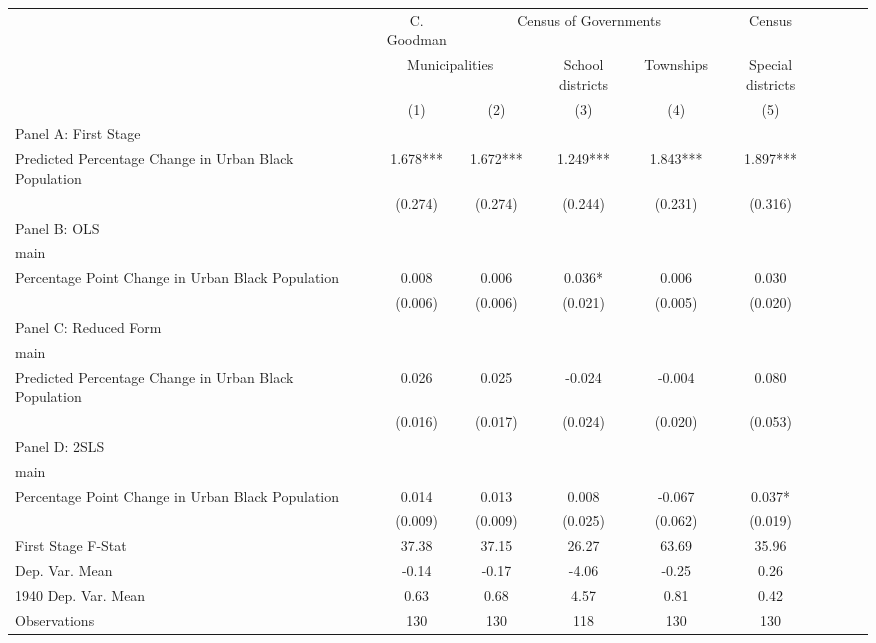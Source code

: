  \begin{tabular}{l*{8}{c}} \toprule
&\multicolumn{1}{c}{C. Goodman}&\multicolumn{3}{c}{Census of Governments}&\multicolumn{1}{c}{Census}\\\cmidrule(lr){2-2}\cmidrule(lr){3-5}\cmidrule(lr){6-6}
&\multicolumn{2}{c}{Municipalities}&\multicolumn{1}{c}{School districts}&\multicolumn{1}{c}{Townships}&\multicolumn{1}{c}{Special districts}&\\\cmidrule(lr){2-3}\cmidrule(lr){4-5}\cmidrule(lr){6-6}
&\multicolumn{1}{c}{(1)}&\multicolumn{1}{c}{(2)}&\multicolumn{1}{c}{(3)}&\multicolumn{1}{c}{(4)}&\multicolumn{1}{c}{(5)}\\
\cmidrule(lr){1-6}
\multicolumn{5}{l}{Panel A: First Stage}\\
\cmidrule(lr){1-6}
Predicted Percentage Change in Urban Black Population&    1.678***&    1.672***&    1.249***&    1.843***&    1.897***\\
                &  (0.274)   &  (0.274)   &  (0.244)   &  (0.231)   &  (0.316)   \\
\cmidrule(lr){1-6}
\multicolumn{5}{l}{Panel B: OLS}\\
\cmidrule(lr){1-6}
main            &            &            &            &            &            \\
Percentage Point Change in Urban Black Population&    0.008   &    0.006   &    0.036*  &    0.006   &    0.030   \\
                &  (0.006)   &  (0.006)   &  (0.021)   &  (0.005)   &  (0.020)   \\
\cmidrule(lr){1-6}
\multicolumn{5}{l}{Panel C: Reduced Form}\\
\cmidrule(lr){1-6}
main            &            &            &            &            &            \\
Predicted Percentage Change in Urban Black Population&    0.026   &    0.025   &   -0.024   &   -0.004   &    0.080   \\
                &  (0.016)   &  (0.017)   &  (0.024)   &  (0.020)   &  (0.053)   \\
\cmidrule(lr){1-6}
\multicolumn{5}{l}{Panel D: 2SLS}\\
\cmidrule(lr){1-6}
main            &            &            &            &            &            \\
Percentage Point Change in Urban Black Population&    0.014   &    0.013   &    0.008   &   -0.067   &    0.037*  \\
                &  (0.009)   &  (0.009)   &  (0.025)   &  (0.062)   &  (0.019)   \\
\midrule
First Stage F-Stat&    37.38   &    37.15   &    26.27   &    63.69   &    35.96   \\
Dep. Var. Mean  &    -0.14   &    -0.17   &    -4.06   &    -0.25   &     0.26   \\
1940 Dep. Var. Mean&     0.63   &     0.68   &     4.57   &     0.81   &     0.42   \\
Observations    &      130   &      130   &      118   &      130   &      130   \\
 \bottomrule \end{tabular}
